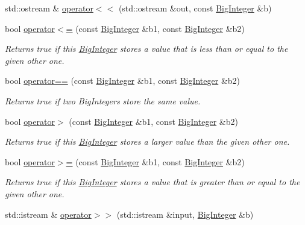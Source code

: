 \begin{DoxyCompactItemize}
std\+::ostream \& \mbox{\hyperlink{classBigInteger_ac88f101625fa13c9bbc286eb90eec023}{operator$<$$<$}} (std\+::ostream \&out, const \mbox{\hyperlink{classBigInteger}{Big\+Integer}} \&b)
\item 
bool \mbox{\hyperlink{classBigInteger_a73169242c1907d12830fe4110a5e2704}{operator$<$=}} (const \mbox{\hyperlink{classBigInteger}{Big\+Integer}} \&b1, const \mbox{\hyperlink{classBigInteger}{Big\+Integer}} \&b2)
\begin{DoxyCompactList}\small\item\em Returns true if this \mbox{\hyperlink{classBigInteger}{Big\+Integer}} stores a value that is less than or equal to the given other one. \end{DoxyCompactList}\item 
bool \mbox{\hyperlink{classBigInteger_acdbc3e3ed5ef2535a628df89780d0a9b}{operator==}} (const \mbox{\hyperlink{classBigInteger}{Big\+Integer}} \&b1, const \mbox{\hyperlink{classBigInteger}{Big\+Integer}} \&b2)
\begin{DoxyCompactList}\small\item\em Returns true if two Big\+Integers store the same value. \end{DoxyCompactList}\item 
bool \mbox{\hyperlink{classBigInteger_a6a9bb9ae99920398555f337f66044594}{operator$>$}} (const \mbox{\hyperlink{classBigInteger}{Big\+Integer}} \&b1, const \mbox{\hyperlink{classBigInteger}{Big\+Integer}} \&b2)
\begin{DoxyCompactList}\small\item\em Returns true if this \mbox{\hyperlink{classBigInteger}{Big\+Integer}} stores a larger value than the given other one. \end{DoxyCompactList}\item 
bool \mbox{\hyperlink{classBigInteger_aac387c7e85293502096e25fe753e6490}{operator$>$=}} (const \mbox{\hyperlink{classBigInteger}{Big\+Integer}} \&b1, const \mbox{\hyperlink{classBigInteger}{Big\+Integer}} \&b2)
\begin{DoxyCompactList}\small\item\em Returns true if this \mbox{\hyperlink{classBigInteger}{Big\+Integer}} stores a value that is greater than or equal to the given other one. \end{DoxyCompactList}\item 
std\+::istream \& \mbox{\hyperlink{classBigInteger_ab3c25317df8d1955db53a700f10e6edc}{operator$>$$>$}} (std\+::istream \&input, \mbox{\hyperlink{classBigInteger}{Big\+Integer}} \&b)

\end{DoxyCompactItemize}
